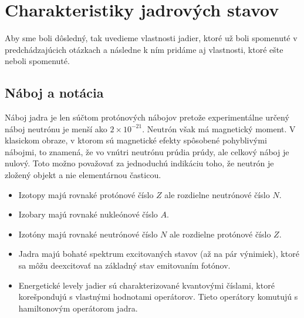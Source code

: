 \documentclass[../../main.tex]{subfiles}
\begin{document}
\chapter{Charakteristiky jadrových stavov}
Aby sme boli dôsledný, tak uvedieme vlastnosti jadier, ktoré už boli spomenuté v predchádzajúcich otázkach a následne k ním pridáme aj vlastnosti, ktoré ešte neboli spomenuté.
\section{Náboj a notácia}
Náboj jadra je len súčtom protónových nábojov pretože experimentálne určený náboj neutrónu je menší ako $2\times 10^{-21}$. Neutrón však má magnetický moment. V klasickom obraze, v ktorom sú magnetické efekty spôsobené pohyblivými nábojmi, to znamená, že vo vnútri neutrónu prúdia prúdy, ale celkový náboj je nulový. Toto možno považovať za jednoduchú indikáciu toho, že neutrón je zložený objekt a nie elementárnou časticou.
\begin{itemize}
	\item Izotopy majú rovnaké protónové číslo $Z$ ale rozdielne neutrónové číslo $N$.
	\item Izobary majú rovnaké nukleónové číslo $A$.
	\item Izotóny majú rovnaké neutrónové číslo $N$ ale rozdielne protónové číslo $Z$.
	\item Jadra majú bohaté spektrum excitovaných stavov (až na pár výnimiek), ktoré sa môžu deexcitovať na základný stav emitovaním fotónov.
	\item Energetické levely jadier sú charakterizované kvantovými číslami, ktoré korešpondujú s vlastnými hodnotami operátorov. Tieto operátory komutujú s hamiltonovým operátorom jadra.
\end{itemize}
\end{document}

